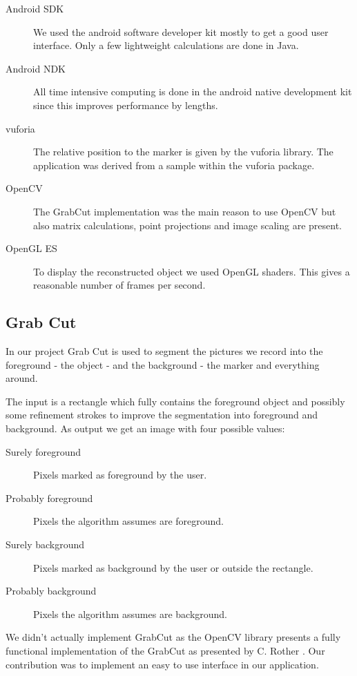 \documentclass[10pt,twocolumn,letterpaper]{article}
\begin{document}
\begin{description}
	\item[Android SDK] We used the android software developer kit mostly to get a good user interface. Only a few lightweight calculations are done in Java.
	\item[Android NDK] All time intensive computing is done in the android native development kit since this improves performance by lengths.
	\item[vuforia] The relative position to the marker is given by the vuforia library. The application was derived from a sample within the vuforia package.
	\item[OpenCV] The GrabCut implementation was the main reason to use OpenCV but also matrix calculations, point projections and image scaling are present.
	\item[OpenGL ES] To display the reconstructed object we used OpenGL shaders. This gives a reasonable number of frames per second.
\end{description}

\subsection{Grab Cut}

In our project Grab Cut is used to segment the pictures we record into the foreground - the object - and the background - the marker and everything around.

The input is a rectangle which fully contains the foreground object and possibly some refinement strokes to improve the segmentation into foreground and background. As output we get an image with four possible values:

\begin{description}
	\item[Surely foreground] Pixels marked as foreground by the user.
	\item[Probably foreground] Pixels the algorithm assumes are foreground.
	\item[Surely background] Pixels marked as background by the user or outside the rectangle.
	\item[Probably background] Pixels the algorithm assumes are background.
\end{description}

We didn't actually implement GrabCut as the OpenCV library presents a fully functional implementation of the GrabCut as presented by C. Rother \etal \cite{Rother}. Our contribution was to implement an easy to use interface in our application.
\end{document}
